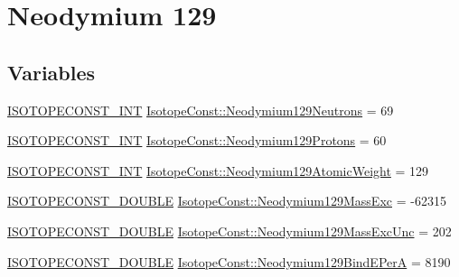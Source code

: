 \hypertarget{group___isotope_const-_neodymium-_nd129}{}\section{Neodymium 129}
\label{group___isotope_const-_neodymium-_nd129}
\subsection*{Variables}
\begin{DoxyCompactItemize}
\item 
\mbox{\hyperlink{group___isotope_const-_macros_ga5f18360b3e99483a35c32d789e62621c}{I\+S\+O\+T\+O\+P\+E\+C\+O\+N\+S\+T\+\_\+\+I\+NT}} \mbox{\hyperlink{group___isotope_const-_neodymium-_nd129_ga0167a27338a43ba6e670f63eb79b360c}{Isotope\+Const\+::\+Neodymium129\+Neutrons}} = 69
\item 
\mbox{\hyperlink{group___isotope_const-_macros_ga5f18360b3e99483a35c32d789e62621c}{I\+S\+O\+T\+O\+P\+E\+C\+O\+N\+S\+T\+\_\+\+I\+NT}} \mbox{\hyperlink{group___isotope_const-_neodymium-_nd129_gafacb48bddb4595adbe33e12ceb1ca17a}{Isotope\+Const\+::\+Neodymium129\+Protons}} = 60
\item 
\mbox{\hyperlink{group___isotope_const-_macros_ga5f18360b3e99483a35c32d789e62621c}{I\+S\+O\+T\+O\+P\+E\+C\+O\+N\+S\+T\+\_\+\+I\+NT}} \mbox{\hyperlink{group___isotope_const-_neodymium-_nd129_gaa8209c4a48fc07248b04ff43231b58c2}{Isotope\+Const\+::\+Neodymium129\+Atomic\+Weight}} = 129
\item 
\mbox{\hyperlink{group___isotope_const-_macros_ga8f45a7272ce02c0b4c65c44636ed719a}{I\+S\+O\+T\+O\+P\+E\+C\+O\+N\+S\+T\+\_\+\+D\+O\+U\+B\+LE}} \mbox{\hyperlink{group___isotope_const-_neodymium-_nd129_ga328538623762d9267c9f7e622a8d7821}{Isotope\+Const\+::\+Neodymium129\+Mass\+Exc}} = -\/62315
\item 
\mbox{\hyperlink{group___isotope_const-_macros_ga8f45a7272ce02c0b4c65c44636ed719a}{I\+S\+O\+T\+O\+P\+E\+C\+O\+N\+S\+T\+\_\+\+D\+O\+U\+B\+LE}} \mbox{\hyperlink{group___isotope_const-_neodymium-_nd129_ga29a19237efd9a644a5ba708f18779507}{Isotope\+Const\+::\+Neodymium129\+Mass\+Exc\+Unc}} = 202
\item 
\mbox{\hyperlink{group___isotope_const-_macros_ga8f45a7272ce02c0b4c65c44636ed719a}{I\+S\+O\+T\+O\+P\+E\+C\+O\+N\+S\+T\+\_\+\+D\+O\+U\+B\+LE}} \mbox{\hyperlink{group___isotope_const-_neodymium-_nd129_gacbb8d4e68b9391445783e40e03dc6b75}{Isotope\+Const\+::\+Neodymium129\+Bind\+E\+PerA}} = 8190
\item 

\end{DoxyCompactItemize}
